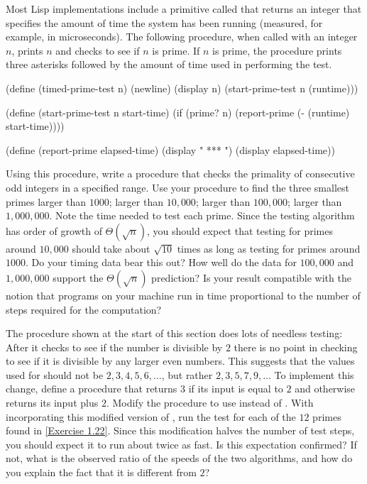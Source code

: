\begin{exercise}
	\label{Exercise 1.22}
	Most Lisp implementations include a primitive called  that returns an integer that specifies the amount of time the system has been running (measured, for example, in microseconds).
	The following  procedure, when called with an integer \( n \), prints \( n \) and checks to see if \( n \) is prime.
	If \( n \) is prime, the procedure prints three asterisks followed by the amount of time used in performing the test.
	\begin{scheme}
	  (define (timed-prime-test n)
	    (newline)
	    (display n)
	    (start-prime-test n (runtime)))

	  (define (start-prime-test n start-time)
	    (if (prime? n)
	        (report-prime (- (runtime) start-time))))

	  (define (report-prime elapsed-time)
	    (display " *** ")
	    (display elapsed-time))
	\end{scheme}
	Using this procedure, write a procedure  that checks the primality of consecutive odd integers in a specified range.
	Use your procedure to find the three smallest primes larger than \( 1000 \);
	larger than \( 10,000 \);
	larger than \( 100,000 \);
	larger than \( 1,000,000 \).
	Note the time needed to test each prime.
	Since the testing algorithm has order of growth of \( Θ(\sqrt{n}) \), you should expect that testing for primes around \( 10,000 \) should take about \( \sqrt{10} \) times as long as testing for primes around \( 1000 \).
	Do your timing data bear this out?
	How well do the data for \( 100,000 \) and \( 1,000,000 \) support the \( Θ(\sqrt{n}) \) prediction?
	Is your result compatible with the notion that programs on your machine run in time proportional to the number of steps required for the computation?
\end{exercise}



\begin{exercise}
	\label{Exercise 1.23}
	The  procedure shown at the start of this section does lots of needless testing:
	After it checks to see if the number is divisible by \( 2 \) there is no point in checking to see if it is divisible by any larger even numbers.
	This suggests that the values used for  should not be \( 2, 3, 4, 5, 6, \dotsc \), but rather \( 2, 3, 5, 7, 9, \dotsc \)
	To implement this change, define a procedure  that returns \( 3 \) if its input is equal to \( 2 \) and otherwise returns its input plus \( 2 \).
	Modify the  procedure to use  instead of .
	With  incorporating this modified version of , run the test for each of the \( 12 \) primes found in \cref{Exercise 1.22}.
	Since this modification halves the number of test steps, you should expect it to run about twice as fast.
	Is this expectation confirmed?
	If not, what is the observed ratio of the speeds of the two algorithms, and how do you explain the fact that it is different from \( 2 \)?
\end{exercise}



